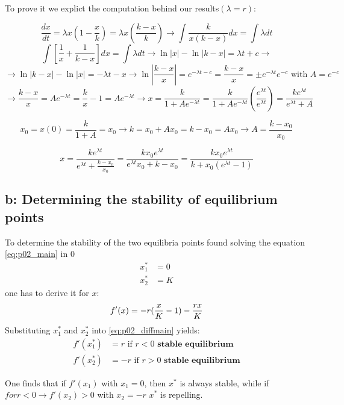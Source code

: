 To prove it we explict the computation behind our results$ (\lambda = r)$:

\[\frac{dx}{dt} = \lambda x (1-\frac{x}{k}) = \lambda x (\frac{k-x}{k}) \rightarrow \int \frac{k}{x(k-x)}dx = \int \lambda dt \]
\[ \int [ \frac{1}{x} + \frac{1}{k-x}]dx = \int \lambda dt \rightarrow \ln |x| - \ln |k-x| = \lambda t + c \rightarrow \]
\[ \rightarrow \ln |k-x| - \ln |x| = -\lambda t - x \rightarrow \ln | \frac{k-x}{x} | = e^{-\lambda t -c} = \frac{k-x}{x} = \pm e^{-\lambda t}e^{-c} \text{ with } A = e^{-c} \]
\[ \rightarrow \frac{k-x}{x} = Ae^{-\lambda t} = \frac{k}{x} -1 = Ae^{-\lambda t} \rightarrow x = \frac{k}{1+Ae^{-\lambda t}} = \frac{k}{1+Ae^{-\lambda t}}(\frac{e^{\lambda t}}{e^{\lambda t}}) = \frac{ke^{\lambda t}}{e^{\lambda t}+A} \]

\[ x_0 = x(0) = \frac{k}{1+A} = x_0 \rightarrow k = x_0 + Ax_0 = k-x_0 = Ax_0 \rightarrow A = \frac{k-x_0}{x_0} \]

\[ x = \frac{ke^{\lambda t}}{e^{\lambda t} + \frac{k-x_0}{x_0}} = \frac{kx_0e^{\lambda t}}{e^{\lambda t}x_0+k-x_0} = \frac{kx_0e^{\lambda t}}{k+x_0(e^{\lambda t} -1)} \]




\subsection{b: Determining the stability of equilibrium points}

To determine the stability of the two equilibria points found solving the equation \ref{eq:p02_main} in $0$
\begin{align}
x^*_1 &= 0\\
x^*_2 &= K
\end{align}
one has to derive it for $x$:
\begin{equation}
f'(x) = - r(\frac{x}{K} - 1) - \frac{rx}{K}\\
\label{eq:p02_diffmain}
\end{equation}
Substituting $x^*_1$ and $x^*_2$ into \ref{eq:p02_diffmain} yields:
\begin{align}
f'(x^*_1) &= r \text{ if } r < 0 \textbf{ stable equilibrium}\\
f'(x^*_2) &= -r \text{ if } r > 0 \textbf{ stable equilibrium}
\end{align}

One finds that if $ f'(x_1) $ with $x_1 = 0$, then $x^{\ast}$ is always stable, while if $ for r < 0 \rightarrow f'(x_2) > 0 $ with $x_2 = -r $ $x^{\ast}$ is repelling.



